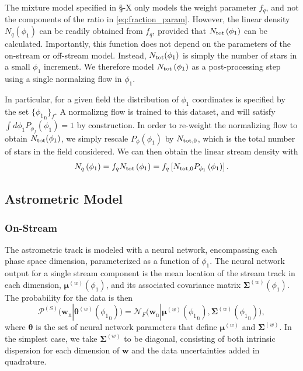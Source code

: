 \documentclass[twocolumn]{aastex631}
\newcommand{\mrm}[1]{\mathrm{#1}}
\newcommand{\mbs}[1]{\boldsymbol{#1}}
\newcommand{\mcal}[1]{\mathcal{#1}}
\newcommand{\pdf}{\mcal{P}}
\newcommand{\nth}[1]{{#1}_{\mrm{n}}}  %
\newcommand{\smallcomponent}[2]{#2^{\scriptscriptstyle (#1)}}
\newcommand{\astroM}[1]{\smallcomponent{w}{#1}}
\begin{document}
        The mixture model specified in \S-X only models the weight parameter $f_q$, and not the components of the ratio in \autoref{eq:fraction_param}. However, the linear density $N_q(\phi_1)$ can be readily obtained from $f_q$, provided that $N_{\rm tot}\left(\phi_1\right)$ can be calculated. Importantly, this function does not depend on the parameters of the on-stream or off-stream model. Instead, $N_{\rm tot}(\phi_1)$ is simply the number of stars in a small $\phi_1$ increment. We therefore model $N_{\rm tot}\left(\phi_1\right)$ as a post-processing step using a single normalzing flow in $\phi_1$. 

        In particular, for a given field the distribution of $\phi_1$ coordinates is specified by the set $\{\nth{\phi_{1}}\}_f$. A normalizng flow is trained to this dataset, and will satisfy $\int d\phi_1 P_{\phi_f}(\phi_1) = 1$ by construction. In order to re-weight the normalizing flow to obtain $N_{\rm tot}(\phi_1)$, we simply rescale $P_{\phi}(\phi_1)$ by $N_{\rm tot,0}$, which is the total number of stars in the field considered. We can then obtain the linear stream density with
        \begin{equation}
            N_q\left(\phi_1\right) = f_q N_{\rm tot} \left(\phi_1\right)  = f_q \left[N_{\rm tot,0} P_{\phi_1}\left(\phi_1\right) \right] .
        \end{equation}

    
        
    \subsection{Astrometric Model} \label{sub:astrometric_model}

        \subsubsection{On-Stream} \label{ssub:astrometric_model_on_stream}
    
            The astrometric track is modeled with a neural network, encompassing each phase space dimension, parameterized as a function of $\phi_1$. The neural network output for a single stream component is the mean location of the stream track in each dimension, $\astroM{\mbs{\mu}}(\phi_1)$, and its associated covariance matrix $\astroM{\mbs{\Sigma}}(\phi_1)$. The probability for the data is then
            \begin{equation}
                \pdf^{(S)}(\nth{\mbs{w}} | \astroM{\mbs{\theta}}(\nth{\phi_{1}})) = \mcal{N}_F \big(\nth{\mbs{w}} | \astroM{\mbs{\mu}} \left(\nth{\phi_{1}} \right), \astroM{\mbs{\Sigma}} \left(\nth{\phi_{1}}\right) \big),
            \end{equation}
            where $\mbs{\theta}$ is the set of neural network parameters that define $\astroM{\mbs{\mu}}$ and $\astroM{\mbs{\Sigma}}$.
            In the simplest case, we take $\astroM{\mbs{\Sigma}}$ to be diagonal, consisting of both intrinsic dispersion for each dimension of $\mbs{w}$ and the data uncertainties added in quadrature. 
\end{document}
